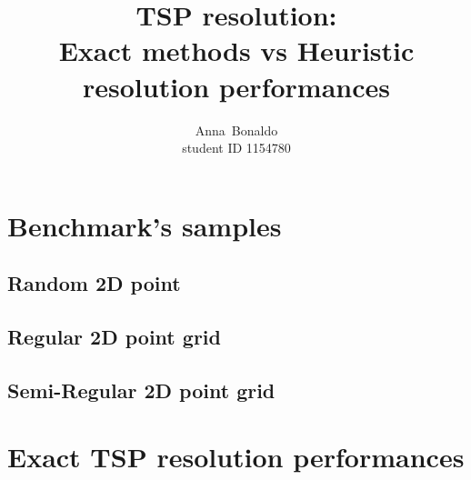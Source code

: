 \documentclass[10pt,journal,compsoc]{IEEEtran}
\begin{document}
\title{TSP resolution: \\  Exact methods vs Heuristic resolution performances }
\author{Anna~Bonaldo \\ \small{student ID 1154780} }

\IEEEtitleabstractindextext{
	\begin{abstract}
	\end{abstract}
	\begin{IEEEkeywords}

	\end{IEEEkeywords}
}
\maketitle
\IEEEdisplaynontitleabstractindextext
\IEEEpeerreviewmaketitle
\ifCLASSOPTIONcompsoc
\section{Benchmark's samples}
\subsection{Random 2D point}
\subsection{Regular 2D point grid}
\subsection{Semi-Regular 2D point grid}
\section{Exact TSP resolution performances}
\end{document}
